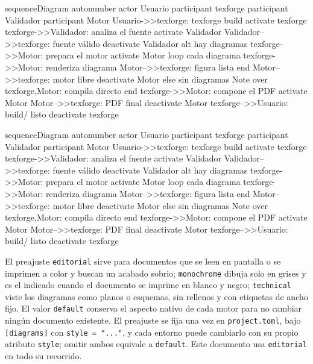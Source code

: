 \begin{mermaid}[style=technical, width=0.62\linewidth, caption={\texttt{technical}: trazo uniforme, sin rellenos}, label={fig:secuencia-technical}, pos=t]
  sequenceDiagram
  autonumber
  actor Usuario
  participant texforge
  participant Validador
  participant Motor
  Usuario->>texforge: texforge build
  activate texforge
  texforge->>Validador: analiza el fuente
  activate Validador
  Validador-->>texforge: fuente válido
  deactivate Validador
  alt hay diagramas
  texforge->>Motor: prepara el motor
  activate Motor
  loop cada diagrama
  texforge->>Motor: renderiza diagrama
  Motor-->>texforge: figura lista
  end
  Motor-->>texforge: motor libre
  deactivate Motor
  else sin diagramas
  Note over texforge,Motor: compila directo
  end
  texforge->>Motor: compone el PDF
  activate Motor
  Motor-->>texforge: PDF final
  deactivate Motor
  texforge-->>Usuario: build/ listo
  deactivate texforge
\end{mermaid}

\begin{mermaid}[style=default, width=0.62\linewidth, caption={\texttt{default}: el aspecto nativo del motor}, label={fig:secuencia-default}, pos=t]
  sequenceDiagram
  autonumber
  actor Usuario
  participant texforge
  participant Validador
  participant Motor
  Usuario->>texforge: texforge build
  activate texforge
  texforge->>Validador: analiza el fuente
  activate Validador
  Validador-->>texforge: fuente válido
  deactivate Validador
  alt hay diagramas
  texforge->>Motor: prepara el motor
  activate Motor
  loop cada diagrama
  texforge->>Motor: renderiza diagrama
  Motor-->>texforge: figura lista
  end
  Motor-->>texforge: motor libre
  deactivate Motor
  else sin diagramas
  Note over texforge,Motor: compila directo
  end
  texforge->>Motor: compone el PDF
  activate Motor
  Motor-->>texforge: PDF final
  deactivate Motor
  texforge-->>Usuario: build/ listo
  deactivate texforge
\end{mermaid}

El preajuste \texttt{editorial} sirve para documentos que se leen en pantalla
o se imprimen a color y buscan un acabado sobrio; \texttt{monochrome} dibuja
solo en grises y es el indicado cuando el documento se imprime en blanco y
negro; \texttt{technical} viste los diagramas como planos o esquemas, sin
rellenos y con etiquetas de ancho fijo. El valor \texttt{default} conserva el
aspecto nativo de cada motor para no cambiar ningún documento existente. El
preajuste se fija una vez en \texttt{project.toml}, bajo \texttt{[diagrams]}
con \texttt{style = "..."}, y cada entorno puede cambiarlo con su propio
atributo \texttt{style}; omitir ambos equivale a \texttt{default}. Este
documento usa \texttt{editorial} en todo su recorrido.
\FloatBarrier

